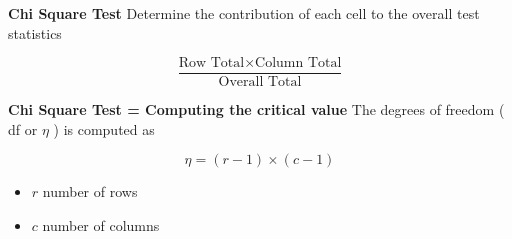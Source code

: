 \begin{framed}
\noindent \textbf{Chi Square Test}
Determine the contribution of each cell to the overall test statistics


\[  \frac{\mbox{Row Total}\times \mbox{Column Total}}{\mbox{Overall Total}} \]

\end{framed}
\begin{framed}
\noindent \textbf{Chi Square Test = Computing the critical value}
The degrees of freedom ( df or $\eta$ ) is computed as

\[ \eta = (r-1)\times(c-1) \]

\begin{itemize}
\item $r$ number of rows
\item $c$ number of columns
\end{itemize}
\end{framed}

